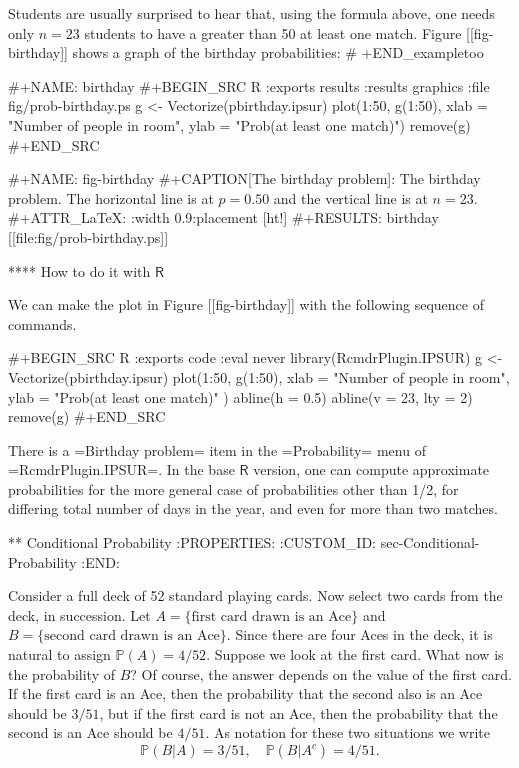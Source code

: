 Students are usually surprised to hear that, using the formula above,
one needs only \(n=23\) students to have a greater than 50%
at least one match. Figure [[fig-birthday]] shows a graph of the birthday
probabilities:
# +END_exampletoo

#+NAME: birthday
#+BEGIN_SRC R :exports results :results graphics :file fig/prob-birthday.ps
g <- Vectorize(pbirthday.ipsur)
plot(1:50, g(1:50), xlab = "Number of people in room", ylab = "Prob(at least one match)")
remove(g)
#+END_SRC

#+NAME: fig-birthday
#+CAPTION[The birthday problem]: \small The birthday problem. The horizontal line is at \(p=0.50\) and the vertical line is at \(n=23\).
#+ATTR_LaTeX: :width 0.9\textwidth :placement [ht!]
#+RESULTS: birthday
[[file:fig/prob-birthday.ps]]

**** How to do it with \(\mathsf{R}\)

We can make the plot in Figure [[fig-birthday]] with the following
sequence of commands.

#+BEGIN_SRC R :exports code :eval never
library(RcmdrPlugin.IPSUR)
g <- Vectorize(pbirthday.ipsur)
plot(1:50, g(1:50), xlab = "Number of people in room", 
  ylab = "Prob(at least one match)" )
abline(h = 0.5)
abline(v = 23, lty = 2)
remove(g)
#+END_SRC

There is a =Birthday problem= item in the =Probability= menu of
=RcmdrPlugin.IPSUR=. In the base \(\mathsf{R}\) version, one can
compute approximate probabilities for the more general case of
probabilities other than 1/2, for differing total number of days in
the year, and even for more than two matches.

** Conditional Probability
:PROPERTIES:
:CUSTOM_ID: sec-Conditional-Probability
:END:

Consider a full deck of 52 standard playing cards. Now select two
cards from the deck, in succession. Let \( A = \{ \mbox{first card
drawn is an Ace} \} \) and \( B = \{ \mbox{second card drawn is an
Ace} \} \). Since there are four Aces in the deck, it is natural to
assign \( \mathbb{P}(A) = 4/52 \). Suppose we look at the first
card. What now is the probability of \(B\)? Of course, the answer
depends on the value of the first card. If the first card is an Ace,
then the probability that the second also is an Ace should be \( 3/51
\), but if the first card is not an Ace, then the probability that the
second is an Ace should be \( 4/51 \). As notation for these two
situations we write 
\[ \mathbb{P}(B|A)=3/51,\quad
\mathbb{P}(B|A^{c})=4/51.  
\]

